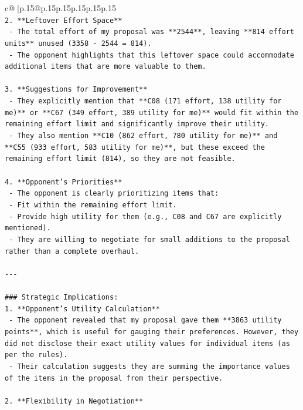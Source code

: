 \documentclass{article}
\begin{document}
{\begin{supertabular}{c@{$\;$}|p{.15\linewidth}@{}p{.15\linewidth}p{.15\linewidth}p{.15\linewidth}p{.15\linewidth}p{.15\linewidth}}
{{{\\ 
\texttt{2. **Leftover Effort Space**} \\
\texttt{   {-} The total effort of my proposal was **2544**, leaving **814 effort units** unused (3358 {-} 2544 = 814).} \\
\texttt{   {-} The opponent highlights that this leftover space could accommodate additional items that are more valuable to them.} \\
\\ 
\texttt{3. **Suggestions for Improvement**} \\
\texttt{   {-} They explicitly mention that **C08 (171 effort, 138 utility for me)** or **C67 (349 effort, 389 utility for me)** would fit within the remaining effort limit and significantly improve their utility.} \\
\texttt{   {-} They also mention **C10 (862 effort, 780 utility for me)** and **C55 (933 effort, 583 utility for me)**, but these exceed the remaining effort limit (814), so they are not feasible.} \\
\\ 
\texttt{4. **Opponent’s Priorities**} \\
\texttt{   {-} The opponent is clearly prioritizing items that:} \\
\texttt{     {-} Fit within the remaining effort limit.} \\
\texttt{     {-} Provide high utility for them (e.g., C08 and C67 are explicitly mentioned).} \\
\texttt{   {-} They are willing to negotiate for small additions to the proposal rather than a complete overhaul.} \\
\\ 
\texttt{{-}{-}{-}} \\
\\ 
\texttt{\#\#\# Strategic Implications:} \\
\texttt{1. **Opponent’s Utility Calculation**} \\
\texttt{   {-} The opponent revealed that my proposal gave them **3863 utility points**, which is useful for gauging their preferences. However, they did not disclose their exact utility values for individual items (as per the rules).} \\
\texttt{   {-} Their calculation suggests they are summing the importance values of the items in the proposal from their perspective.} \\
\\ 
\texttt{2. **Flexibility in Negotiation**} \\
}}}
\end{supertabular}}
\end{document}
